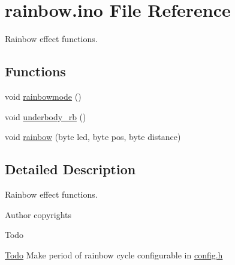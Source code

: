 \hypertarget{rainbow_8ino}{}\section{rainbow.\+ino File Reference}
\label{rainbow_8ino}


Rainbow effect functions.  


\subsection*{Functions}
{\bf }\par
\begin{DoxyCompactItemize}
\item 
void \hyperlink{group__rainbow_ga51e30a1c423190e50127c6651c991612}{rainbowmode} ()
\item 
void \hyperlink{group__rainbow_ga3656f41cfe48a0bf63e63099673ac4c4}{underbody\+\_\+rb} ()
\item 
void \hyperlink{group__rainbow_ga80198b192c269a2b71cfa41654a3aafd}{rainbow} (byte led, byte pos, byte distance)
\end{DoxyCompactItemize}



\subsection{Detailed Description}
Rainbow effect functions. 

\begin{DoxyAuthor}{Author}
copyrights 
\end{DoxyAuthor}
\begin{DoxyRefDesc}{Todo}
\item[\hyperlink{todo__todo000004}{Todo}]Make period of rainbow cycle configurable in \hyperlink{config_8h}{config.\+h} \end{DoxyRefDesc}
